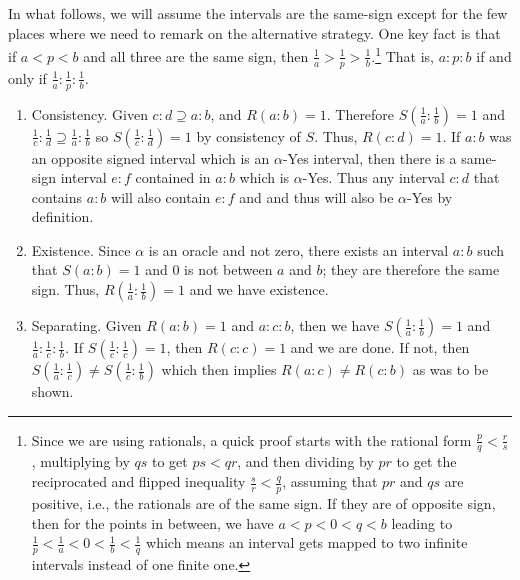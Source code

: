 \documentclass[12pt]{article}
\theoremstyle{remark}
\begin{document}
\begin{itemize}
    In what follows, we will assume the intervals are the same-sign except for the few places where we need to remark on the alternative strategy. One key fact is that if $a<p<b$ and all three are the same sign, then $\frac{1}{a} > \frac{1}{p} > \frac{1}{b}$.\footnote{Since we are using rationals, a quick proof starts with the rational form $\frac{p}{q} < \frac{r}{s}$, multiplying by $qs$ to get $ps < qr$, and then dividing by $pr$ to get the reciprocated and flipped inequality $\frac{s}{r} < \frac{q}{p}$, assuming that $pr$ and $qs$ are positive, i.e., the rationals are of the same sign. If they are of opposite sign, then for the points in between, we have $a < p < 0< q< b$ leading to $\frac{1}{p} < \frac{1}{a} < 0 < \frac{1}{b} < \frac{1}{q}$ which means an interval gets mapped to two infinite intervals instead of one finite one.} That is, $a:p:b$ if and only if $\frac{1}{a}:\frac{1}{p}:\frac{1}{b}$.
    
    \begin{enumerate}
        \item Consistency. Given $c:d \supseteq a:b$, and $R(a:b)=1$. Therefore $S(\frac{1}{a}:\frac{1}{b}) = 1$ and $\frac{1}{c}:\frac{1}{d} \supseteq \frac{1}{a}:\frac{1}{b}$ so $S(\frac{1}{c}:\frac{1}{d})=1$ by consistency of $S$. Thus, $R(c:d) = 1$. If $a:b$ was an opposite signed interval which is an $\alpha$-Yes interval, then there is a same-sign interval $e:f$ contained in $a:b$ which is $\alpha$-Yes. Thus any interval $c:d$ that contains $a:b$ will also contain $e:f$ and and thus will also be $\alpha$-Yes by definition. 
        \item Existence. Since $\alpha$ is an oracle and not zero, there exists an interval $a:b$ such that $S(a:b)=1$ and 0 is not between $a$ and $b$; they are therefore the same sign. Thus, $R(\frac{1}{a}:\frac{1}{b})=1$ and we have existence. 
        \item Separating. Given $R(a:b)=1$ and $a:c:b$, then we have $S(\frac{1}{a}:\frac{1}{b})=1$ and $\frac{1}{a}:\frac{1}{c}:\frac{1}{b}$. If $S(\frac{1}{c}:\frac{1}{c})=1$, then $R(c:c)=1$ and we are done. If not, then $S(\frac{1}{a}:\frac{1}{c}) \neq S(\frac{1}{c}:\frac{1}{b})$ which then implies $R(a:c)\neq R(c:b)$ as was to be shown. 
        

\end{enumerate}
\end{itemize}
\end{document}

